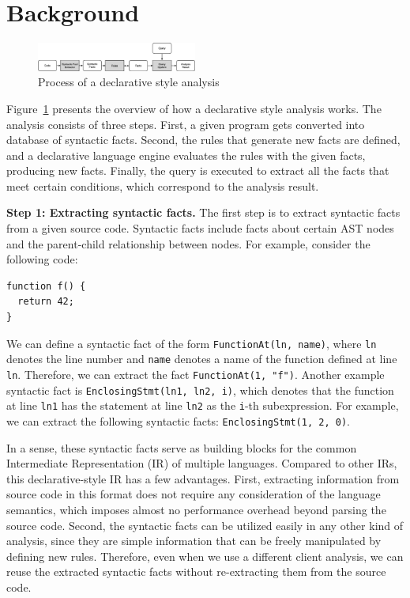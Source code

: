 \section{Background}\label{sec:background} 

\begin{figure}[t]
  \centering
  \vspace{2mm}
  \includegraphics[width=0.47\textwidth]{img/ov1.png}
  \caption{Process of a declarative style analysis}
  \label{fig:ov1}
\end{figure}

Figure~\ref{fig:ov1} presents the overview of how a declarative style analysis
works.  The analysis consists of three steps.  First, a given program gets
converted into database of syntactic facts.  Second, the rules that generate
new facts are defined, and a declarative language engine evaluates the rules
with the given facts, producing new facts.  Finally, the query is executed to
extract all the facts that meet certain conditions, which correspond to the
analysis result.

\textbf{Step 1: Extracting syntactic facts.}
The first step is to extract syntactic facts from a given source code.
Syntactic facts include facts about certain AST nodes and
the parent-child relationship between nodes. For example, consider
the following code:

\begin{lstlisting}[style=cpp,xleftmargin=2.5em]
function f() {
  return 42;
}
\end{lstlisting}
We can define a syntactic fact of the form {\tt FunctionAt(ln, name)},
where {\tt ln} denotes the line number and {\tt name}
denotes a name of the function defined at line {\tt ln}.
Therefore, we can extract the fact {\tt FunctionAt(1, "f")}.
Another example syntactic fact is {\tt EnclosingStmt(ln1, ln2, i)},
which denotes that the function at line {\tt ln1} has the statement
at line {\tt ln2} as the {\tt i}-th subexpression.
For example, we can extract the following syntactic facts:
{\tt EnclosingStmt(1, 2, 0)}.

In a sense, these syntactic facts serve as building blocks for the
common Intermediate Representation (IR) of multiple languages.
Compared to other IRs, this declarative-style IR has a few advantages.
First, extracting information from source code in this format does not
require any consideration of the language semantics, which imposes
almost no performance overhead beyond parsing the source code.
Second, the syntactic facts can be utilized easily in any other kind of
analysis, since they are simple information that can be freely
manipulated by defining new rules. Therefore, even when we use a different
client analysis, we can reuse the extracted syntactic facts
without re-extracting them from the source code.

